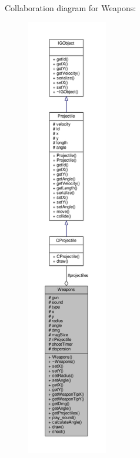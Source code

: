 Collaboration diagram for Weapons\+:\nopagebreak
\begin{figure}[H]
\begin{center}
\leavevmode
\includegraphics[height=550pt]{class_weapons__coll__graph}
\end{center}
\end{figure}
